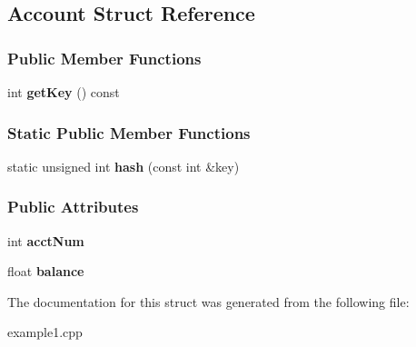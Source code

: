 \hypertarget{struct_account}{}\subsection{Account Struct Reference}
\label{struct_account}
\subsubsection*{Public Member Functions}
\begin{DoxyCompactItemize}
\item 
int {\bfseries get\+Key} () const \hypertarget{struct_account_a799fdb1580f800ef7fba220c0dfa9ed9}{}\label{struct_account_a799fdb1580f800ef7fba220c0dfa9ed9}

\end{DoxyCompactItemize}
\subsubsection*{Static Public Member Functions}
\begin{DoxyCompactItemize}
\item 
static unsigned int {\bfseries hash} (const int \&key)\hypertarget{struct_account_a05ec48bb7b69a8e39a2f66077fb5f0e5}{}\label{struct_account_a05ec48bb7b69a8e39a2f66077fb5f0e5}

\end{DoxyCompactItemize}
\subsubsection*{Public Attributes}
\begin{DoxyCompactItemize}
\item 
int {\bfseries acct\+Num}\hypertarget{struct_account_a28c251b009a021f846b5c1a612142c3a}{}\label{struct_account_a28c251b009a021f846b5c1a612142c3a}

\item 
float {\bfseries balance}\hypertarget{struct_account_a3acb87e14fe08776a714037637f248f7}{}\label{struct_account_a3acb87e14fe08776a714037637f248f7}

\end{DoxyCompactItemize}


The documentation for this struct was generated from the following file\+:\begin{DoxyCompactItemize}
\item 
example1.\+cpp\end{DoxyCompactItemize}
